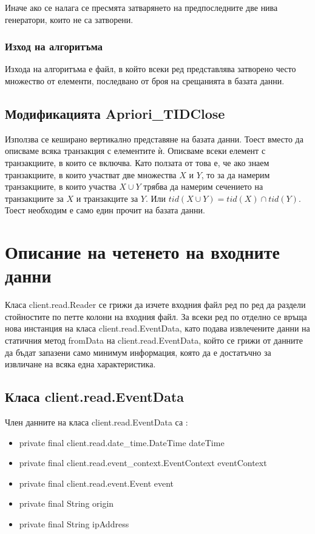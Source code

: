 \documentclass[a4paper, 12pt]{article}
\begin{document}
Иначе ако се налага се пресмята затварянето на предпоследните две нива генератори, които не са затворени.
\subsubsection{Изход на алгоритъма}
Изхода на алгоритъма е файл, в който всеки ред представлява затворено често множество от елементи, последвано от броя на срещанията в базата данни.
\subsection{Модификацията Apriori\_TIDClose}
Използва се кеширано вертикално представяне на базата данни. Тоест вместо да описваме всяка транзакция с елементите ѝ.
Описваме всеки елемент с транзакциите, в които се включва. Като ползата от това е,
че ако знаем транзакциите, в които участват две множества \(X\) и \(Y\), то за да намерим транзакциите,
в които участва \(X \cup Y\) трябва да намерим сечението на транзакциите за \(X\) и транзакците за \(Y\).
Или \(tid(X \cup Y) = tid(X) \cap tid(Y)\). Тоест необходим е само един прочит на базата данни.

\section{Описание на четенето на входните данни}
Класа client.read.Reader се грижи да изчете входния файл ред по ред да раздели стойностите по петте колони на входния файл.
За всеки ред по отделно се връща нова инстанция на класа client.read.EventData, като подава извлечените данни на статичния метод fromData на client.read.EventData, който се грижи от данните да бъдат запазени само минимум информация, която да е достатъчно за извличане на всяка една характеристика.

\subsection{Класа client.read.EventData}
Член данните на класа client.read.EventData са :
\begin{itemize}
\item private final client.read.date\_time.DateTime dateTime
\item private final client.read.event\_context.EventContext eventContext
\item private final client.read.event.Event event
\item private final String origin
\item private final String ipAddress 
\end{itemize}
\end{document}
